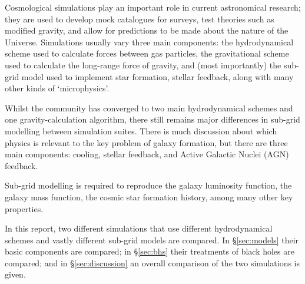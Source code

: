 Cosmological simulations play an important role in current astronomical
research; they are used to develop mock catalogues for surveys, test theories
such as modified gravity, and allow for predictions to be made about the
nature of the Universe. Simulations usually vary three main components:
the hydrodynamical scheme used to calculate forces between gas particles,
the gravitational scheme used to calculate the long-range force of gravity,
and (most importantly) the sub-grid model used to implement star formation,
stellar feedback, along with many other kinds of `microphysics'.

Whilst the community has converged to two main hydrodynamical schemes and one
gravity-calculation algorithm, there still remains major differences in
sub-grid modelling between simulation suites. There is much discussion about
which physics is relevant to the key problem of galaxy formation, but there
are three main components: cooling, stellar feedback, and Active Galactic
Nuclei (AGN) feedback.

Sub-grid modelling is required to reproduce the galaxy luminosity function,
the galaxy mass function, the cosmic star formation history, among many
other key properties.

In this report, two different simulations that use different hydrodynamical
schemes and vastly different sub-grid models are compared. In §\ref{sec:models}
their basic components are compared; in §\ref{sec:bhs} their treatments
of black holes are compared; and in §\ref{sec:discussion} an overall comparison
of the two simulations is given. 

